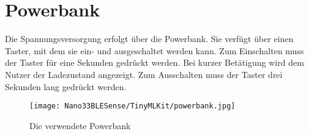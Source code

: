 %
%
%


\chapter{Powerbank}



Die Spannungsversorgung erfolgt über die Powerbank. Sie verfügt über einen Taster, mit dem sie ein- und ausgeschaltet werden kann. Zum Einschalten muss der Taster für eine Sekunden gedrückt werden. Bei kurzer Betätigung wird dem Nutzer der Ladezustand angezeigt. Zum Ausschalten muss der Taster drei Sekunden lang gedrückt werden. 

\begin{figure}[H]
    \centering
    \texttt{[image: Nano33BLESense/TinyMLKit/powerbank.jpg]}
    \caption{Die verwendete Powerbank}
\end{figure}




